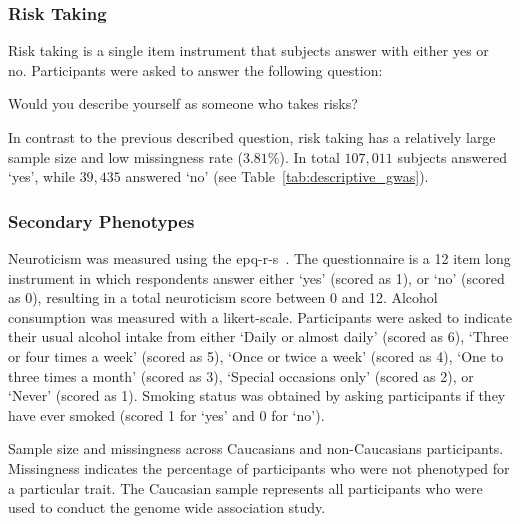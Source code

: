 \subsubsection{Risk Taking}
\label{ssub:risk_taking}
Risk taking is a single item instrument that subjects answer with either yes or no.
Participants were asked to answer the following question:
\begin{displayquote}
  Would you describe yourself as someone who takes risks?
\end{displayquote}
In contrast to the previous described question, risk taking has a relatively large sample size and low missingness rate ($3.81\%$).
In total $107,011$ subjects answered `yes', while $39,435$ answered `no' (see Table~\ref{tab:descriptive_gwas}).

\subsubsection{Secondary Phenotypes}
\label{ssub:sec_pheno}

Neuroticism was measured using the \acrfull{epq-r-s}~\cite{Eysenck1985}. 
The questionnaire is a 12 item long instrument in which respondents answer either `yes' (scored as 1), or `no' (scored as 0),
resulting in a total neuroticism score between 0 and 12.
Alcohol consumption was measured with a likert-scale.
Participants were asked to indicate their usual alcohol intake from either `Daily or almost daily' (scored as 6), `Three or four times a week' (scored as 5), `Once or twice a week' (scored as 4), `One to three times a month' (scored as 3), `Special occasions only' (scored as 2), or `Never' (scored as 1).
Smoking status was obtained by asking participants if they have ever smoked (scored 1 for `yes' and 0 for `no').


\begin{table}[!htpb]
	\centering
	\resizebox{\textwidth}{!}{}
  \caption[Sample Size and Missingness of UK Biobank]{
    Sample size and missingness across Caucasians and non-Caucasians participants.
    Missingness indicates the percentage of participants who were not phenotyped for a particular trait.
    The Caucasian sample represents all participants who were used to conduct the genome wide association study.
}\label{tab:descriptive_gwas} 
\end{table}

